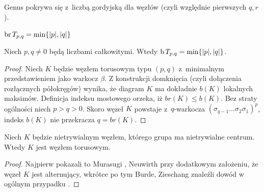 Genus pokrywa się z~liczbą gordyjską dla węzłów (czyli względnie pierwszych $q, r$).

\begin{proposition}
    \label{prp:torus_bridge_number}
    $\operatorname{br} T_{p, q} = \min \{|p|, |q|\}$
\end{proposition}

\begin{corollary}
    \label{cor:torus_braid_number}
    Niech $p, q \neq 0$ będą liczbami całkowitymi.
    Wtedy $\operatorname{b} T_{p, q} = \min \{|p|, |q|\}$.
\end{corollary}

\begin{proof}
    Niech $K$ będzie węzłem torusowym typu $(p,q)$ z~minimalnym przedstawieniem jako warkocz $\beta$.
    Z konstrukcji domknięcia (czyli dołączenia rozłącznych półokręgów) wynika,
    że diagram $K$ ma dokładnie $b(K)$ lokalnych maksimów.
    Definicja indeksu mostowego orzeka, iż $br(K) \le b(K)$.
    Bez straty ogólności niech $p > q > 0$.
    Skoro węzeł $K$ powstaje z~$q$-warkocza $(\sigma_{q-1} \ldots \sigma_2\sigma_1)^p$,
    indeks $b(K)$ nie przekracza $q = br(K)$.
\end{proof}

\begin{proposition}
    Niech $K$ będzie nietrywialnym węzłem, którego grupa ma nietrywialne centrum.
    Wtedy $K$ jest węzłem torusowym.
\end{proposition}

\begin{proof}
    Najpierw pokazali to Murasugi \cite{murasugi61}, Neuwirth \cite{neuwirth61} przy dodatkowym założeniu, że węzeł $K$ jest alternujący,
    wkrótce po tym Burde, Zieschang znaleźli dowód w ogólnym przypadku \cite{burde66}.
\end{proof}

